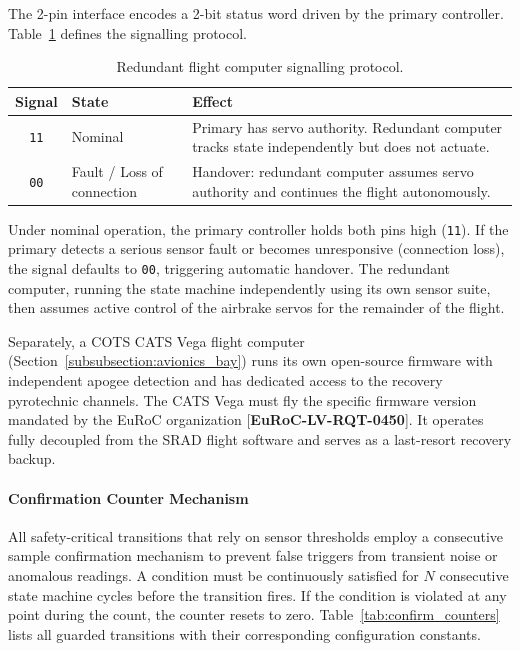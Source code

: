 \documentclass[11pt, a4paper]{article} %
\newcommand{\req}[1]{[\textcolor{EtseNavy}{\textbf{#1}}]}
\begin{document}
The 2-pin interface encodes a 2-bit status word driven by the primary controller. Table~\ref{tab:redundancy_signals} defines the signalling protocol.

\begin{table}[H]
\centering
\caption{Redundant flight computer signalling protocol.}
\label{tab:redundancy_signals}
\begin{tabularx}{\textwidth}{c l X}
\toprule
\textbf{Signal} & \textbf{State} & \textbf{Effect} \\
\midrule
\texttt{11} & Nominal & Primary has servo authority. Redundant computer tracks state independently but does not actuate. \\
\addlinespace
\texttt{00} & Fault / Loss of connection & Handover: redundant computer assumes servo authority and continues the flight autonomously. \\
\bottomrule
\end{tabularx}
\end{table}

Under nominal operation, the primary controller holds both pins high (\texttt{11}). If the primary detects a serious sensor fault or becomes unresponsive (connection loss), the signal defaults to \texttt{00}, triggering automatic handover. The redundant computer, running the state machine independently using its own sensor suite, then assumes active control of the airbrake servos for the remainder of the flight.

Separately, a COTS CATS Vega flight computer (Section~\ref{subsubsection:avionics_bay}) runs its own open-source firmware with independent apogee detection and has dedicated access to the recovery pyrotechnic channels. The CATS Vega must fly the specific firmware version mandated by the EuRoC organization \req{EuRoC-LV-RQT-0450}. It operates fully decoupled from the SRAD flight software and serves as a last-resort recovery backup.

\paragraph{Confirmation Counter Mechanism}

All safety-critical transitions that rely on sensor thresholds employ a consecutive sample confirmation mechanism to prevent false triggers from transient noise or anomalous readings. A condition must be continuously satisfied for $N$ consecutive state machine cycles before the transition fires. If the condition is violated at any point during the count, the counter resets to zero. Table~\ref{tab:confirm_counters} lists all guarded transitions with their corresponding configuration constants.
\end{document}
